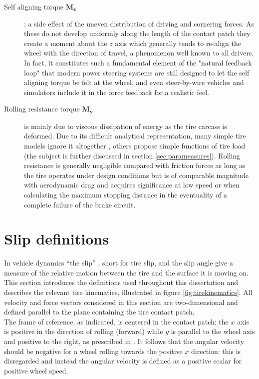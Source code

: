 \documentclass[12pt,a4paper]{report}
\newcommand{\virgolette}[1]{
\textquotedblleft #1\textquotedblright
}
\begin{document}
\begin{description}
\item[Self aligning torque $\mathbf{M_z}$]: a side effect of the uneven distribution of driving and cornering forces. As these do not develop uniformly along the length of the contact patch they create a moment about the $z$ axis which generally tends to re-align the wheel with the direction of travel, a phenomenon well known to all drivers. In fact, it constitutes such a fundamental element of the "natural feedback loop" that modern power steering systems are still designed to let the self aligning torque be felt at the wheel, and even steer-by-wire vehicles and simulators include it in the force feedback for a realistic feel.

\item[Rolling resistance torque $\mathbf{M_y}$] is mainly due to viscous dissipation of energy as the tire carcass is deformed. Due to its difficult analytical representation, many simple tire models ignore it altogether \citep{compare74}, others \citep{wong01} propose simple functions of tire load (the subject is further discussed in section \ref{sec:parameasures}). 
Rolling resistance is generally negligible compared with friction forces as long as the tire operates under design conditions but is of comparable magnitude with aerodynamic drag and acquires significance at low speed or when calculating the maximum stopping distance in the eventuality of a complete failure of the brake circuit.
\end{description}

\section{Slip definitions} \label{sec:slipdef}
In vehicle dynamics \virgolette{the slip} , short for tire slip, and the slip angle give a measure of the relative motion between the tire and the surface it is moving on.
This section introduces the definitions used throughout this dissertation and describes the relevant tire kinematics, illustrated in figure \ref{fig:tirekinematics}. All velocity and force vectors considered in this section are two-dimensional and defined parallel to the plane containing the tire contact patch.\\
The frame of reference, as indicated, is centered in the contact patch: the $x$ axis is positive in the direction of rolling (forward) while $y$ is parallel to the wheel axis and positive to the right, as prescribed in \citep{SAEj670e}. It follows that the angular velocity should be negative for a wheel rolling towards the positive $x$ direction: this is disregarded and instead the angular velocity is defined as a positive scalar for positive wheel speed.
\end{document}
